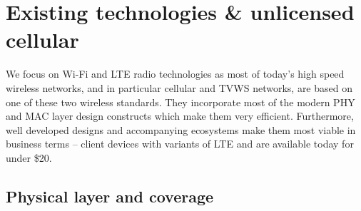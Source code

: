 

\section{Existing technologies \& unlicensed cellular}
We focus on Wi-Fi and LTE radio technologies as most of today's high speed wireless networks, and in particular cellular and TVWS networks, are based on one of these two wireless standards.
They incorporate most of the modern PHY and MAC layer design constructs which make them very efficient.
Furthermore, well developed designs and accompanying ecosystems make them most viable in business terms -- client devices with variants of LTE and \wf are available today for under \$20. 



\subsection{Physical layer and coverage}
\label{sec:PHY}


